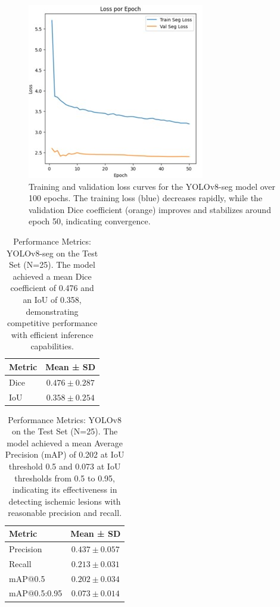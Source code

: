 \documentclass[12pt]{article}
\begin{document}
\begin{figure}[tp]
    \centering
    \includegraphics[width=.7\textwidth]{figures/Figure 5.jpg}
    \caption{Training and validation loss curves for the YOLOv8-seg model over 100 epochs. The training loss (blue) decreases rapidly, while the validation Dice coefficient (orange) improves and stabilizes around epoch 50, indicating convergence.}
    \label{fig:yolov8_loss_curve}
\end{figure}

\begin{table}[tp]
\centering
\begin{tabular}{lc}
\toprule
\textbf{Metric} & \textbf{Mean ± SD} \\
\midrule
Dice & $0.476 \pm 0.287$ \\
IoU & $0.358 \pm 0.254$ \\
\bottomrule
\end{tabular}
\caption{Performance Metrics: YOLOv8-seg on the Test Set (N=25). The model achieved a mean Dice coefficient of 0.476 and an IoU of 0.358, demonstrating competitive performance with efficient inference capabilities.}
\label{tab:yolov8_metrics}
\end{table}

\begin{table}[tp]
\centering
\begin{tabular}{lc}
\toprule
\textbf{Metric} & \textbf{Mean ± SD} \\
\midrule
Precision & $0.437 \pm 0.057$ \\
Recall & $0.213 \pm 0.031$ \\
mAP@0.5 & $0.202 \pm 0.034$ \\
mAP@0.5:0.95 & $0.073 \pm 0.014$ \\
\bottomrule
\end{tabular}
\caption{Performance Metrics: YOLOv8 on the Test Set (N=25). The model achieved a mean Average Precision (mAP) of 0.202 at IoU threshold 0.5 and 0.073 at IoU thresholds from 0.5 to 0.95, indicating its effectiveness in detecting ischemic lesions with reasonable precision and recall.}
\label{tab:yolov8_detection_metrics}
\end{table}
\end{document}
